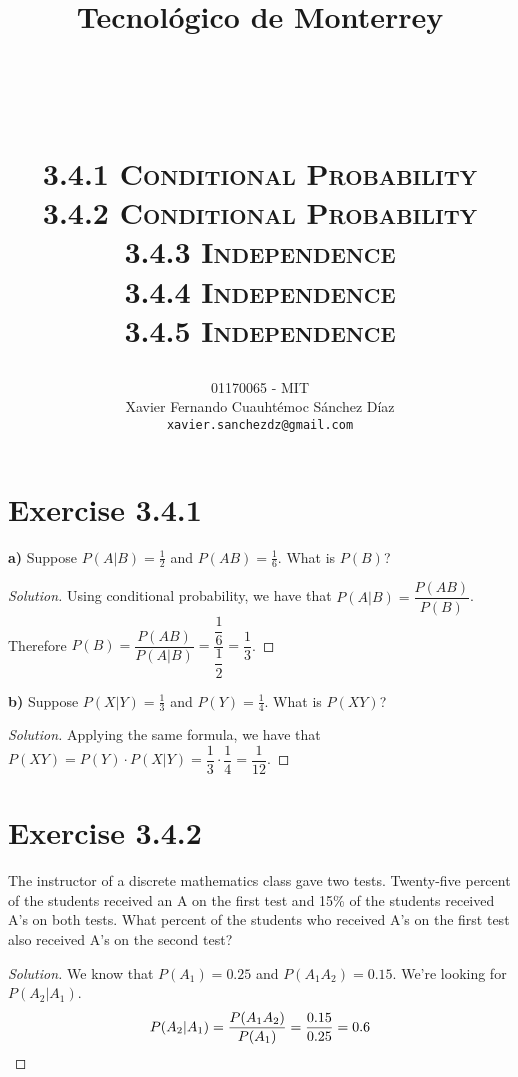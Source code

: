 \documentclass[titlepage, letterpaper, fleqn]{article}
\title{
\vspace{1in}
\textbf{Tecnológico de Monterrey} \\
\vspace{0.5in}
\textmd{\mahclass} \\
\large{\textit{\mahteacher}} \\
\vspace{0.5in}
\textsc{\mahtitle}\\
\textsc{3.4.1 Conditional Probability}\\
\textsc{3.4.2 Conditional Probability}\\
\textsc{3.4.3 Independence}\\
\textsc{3.4.4 Independence}\\
\textsc{3.4.5 Independence}\\
\author{01170065  - MIT \\
Xavier Fernando Cuauhtémoc Sánchez Díaz \\
\texttt{xavier.sanchezdz@gmail.com}}
\date{\mahdate}
}
\newcommand{\spacepls}{\vspace{5mm}}
\renewcommand\qedsymbol{\(\blacksquare\)}
\newenvironment{solution}
{\renewcommand\qedsymbol{$\square$}\begin{proof}[Solution]}
{\end{proof}}
\begin{document}
\begin{titlepage}
\maketitle
\end{titlepage}

%
%

\section{Exercise 3.4.1}

{\large \textbf{a)} Suppose \(P(A \vert B) = \frac{1}{2}\) and \(P(AB) = \frac{1}{6}\). What is \(P(B)\)?}

\begin{solution}
Using conditional probability, we have that \(P(A \vert B) = \dfrac{P(AB)}{P(B)}\).\\
Therefore \(P(B) = \dfrac{P(AB)}{P(A \vert B)} = \dfrac{\dfrac{1}{6}}{\dfrac{1}{2}} = \dfrac{1}{3}\).
\end{solution}

\spacepls

{\large \textbf{b)} Suppose \(P(X \vert Y) = \frac{1}{3}\) and \(P(Y) = \frac{1}{4}\). What is \(P(XY)\)?}

\begin{solution}
Applying the same formula, we have that \(P(XY) = P(Y) \cdot P(X \vert Y) = \dfrac{1}{3} \cdot \dfrac{1}{4} = \dfrac{1}{12}\).
\end{solution}

\spacepls

\section{Exercise 3.4.2}

{\large The instructor of a discrete mathematics class gave two tests. Twenty-five percent of the students received an A on the first test and 15\% of the students received A's on both tests.
What percent of the students who received A's on the first test also received A's on the second test?}

\begin{solution}
We know that \(P(A_1) = 0.25\) and \(P(A_1 A_2) = 0.15\). We're looking for \(P(A_2 \vert A_1)\).
\[P(A_2 \vert A_1) = \dfrac{P(A_1 A_2)}{P(A_1)} = \dfrac{0.15}{0.25} = 0.6 \qedhere\]
\end{solution}

\spacepls
\end{document}
